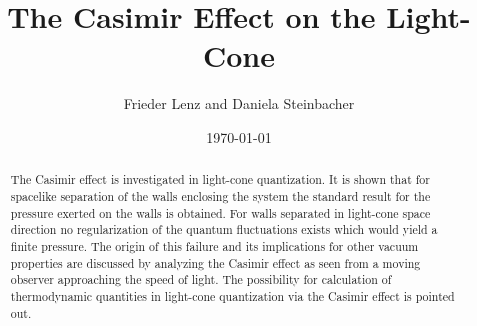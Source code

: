 \documentclass[a4paper,twocolumn,eqsecnum,aps]{revtex4}
\begin{document}
\title{ The Casimir Effect on the Light-Cone}
\author{Frieder Lenz and Daniela Steinbacher}
\address{Institut f\"ur Theoretische Physik III\\ 
Universit\"at Erlangen-N\"urnberg\\ 
Staudtstra\ss e 7\\ 
D-91058 Erlangen\\ 
Germany }
\date{\today} 
\begin{abstract}
The Casimir effect is investigated in light-cone quantization. It is shown that for spacelike separation of the walls enclosing the system the standard result for the pressure exerted on the walls is obtained. For walls separated in light-cone space direction no regularization of the  quantum fluctuations exists which would yield a finite pressure. The origin of this failure and its implications for other vacuum properties are discussed  by analyzing the Casimir effect as seen from a moving observer approaching the speed of light. The possibility  for calculation of thermodynamic quantities in light-cone quantization via the Casimir effect is pointed out.   
\end{abstract} 
\maketitle

\end{document}
